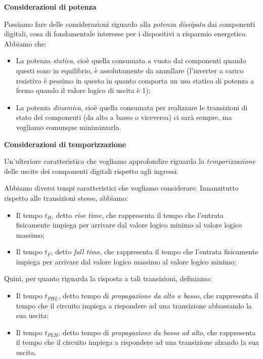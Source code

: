 \documentclass[a4paper,11pt]{article}
\begin{document}
\par\smallskip

\noindent
\textbf{\textsf{Considerazioni di potenza}}

\noindent
Possiamo fare delle considerazioni riguardo alla \textit{potenza dissipata} dai componenti digitali, cosa di fondamentale interesse per i dispositivi a risparmio energetico. Abbiamo che:
\begin{itemize}
	\item La potenza \textit{statica}, cioè quella consumata a vuoto dai componenti quando questi sono in equilibrio, è assolutamente da annullare (l'inverter a carico resistivo è pessimo in questo in quanto comporta un uso statico di potenza a fermo quando il valore logico di uscita è 1);
	\item La potenza \textit{dinamica}, cioè quella consumata per realizzare le transizioni di stato dei componenti (da alto a basso o viceversa) ci sarà sempre, ma vogliamo comunque minimizzarla.
\end{itemize}

\par\smallskip

\noindent
\textbf{\textsf{Considerazioni di temporizzazione}}

\noindent
Un'ulteriore caratteristica che vogliamo approfondire riguarda la \textit{temporizzazione} delle uscite dei componenti digitali rispetto agli ingressi.

Abbiamo diversi tempi caratteristici che vogliamo considerare. Innanzitutto rispetto alle transizioni stesse, abbiamo:
\begin{itemize}
	\item Il tempo $t_R$, detto \textit{rise time}, che rappresenta il tempo che l'entrata fisicamente impiega per arrivare dal valore logico minimo al valore logico massimo;
	\item Il tempo $t_F$, detto \textit{fall time}, che rappresenta il tempo che l'entrata fisicamente impiega per arrivare dal valore logico massimo al valore logico minimo;
\end{itemize}

Quini, per quanto riguarda la risposta a tali transizioni, definiamo:
\begin{itemize}
	\item Il tempo $t_{PHL}$, detto tempo di \textit{propagazione da alto a basso}, che rappresenta il tempo che il circuito impiega a rispondere ad una transizione abbassando la sua uscita;
	\item Il tempo $t_{PLH}$, detto tempo di \textit{propagazione da basso ad alto}, che rappresenta il tempo che il circuito impiega a rispondere ad una transizione alzando la sua uscita.
\end{itemize}
\end{document}
